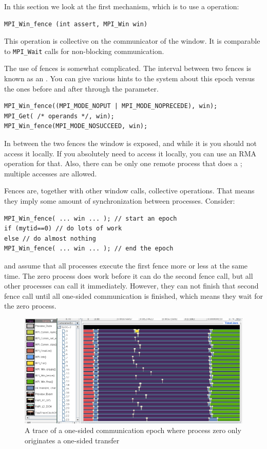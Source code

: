 In this section we look at the first mechanism,
which is to use a  operation:
\begin{lstlisting}
MPI_Win_fence (int assert, MPI_Win win)
\end{lstlisting}
This operation is collective on the communicator of the window.
It is comparable to \lstinline$MPI_Wait$ calls for non-blocking communication.

The use of fences is somewhat complicated. The interval between two fences
is known as an .
You can give various hints to the system about this epoch versus the ones
before and after through the  parameter.
\begin{lstlisting}
MPI_Win_fence((MPI_MODE_NOPUT | MPI_MODE_NOPRECEDE), win);
MPI_Get( /* operands */, win);
MPI_Win_fence(MPI_MODE_NOSUCCEED, win);
\end{lstlisting}
In between the two fences the window is exposed, and while it is you
should not access it locally. If you absolutely need to access it
locally, you can use an \ac{RMA} operation for that. Also, there can be only one
remote process that does a ; multiple  accesses are allowed.

Fences are, together with other window calls, collective operations. That means they 
imply some amount of synchronization between processes. Consider:
\begin{lstlisting}
MPI_Win_fence( ... win ... ); // start an epoch
if (mytid==0) // do lots of work
else // do almost nothing
MPI_Win_fence( ... win ... ); // end the epoch
\end{lstlisting}
and assume that all processes execute the first fence more or less at the same time.
The zero process does work before it can do the second fence call, but all other
processes can call it immediately. However, they can not finish that second fence call
until all one-sided communication is finished, which means they wait for the zero process.
\begin{figure}[ht]
  \includegraphics[scale=.4]{graphics/lonestar-twonode-put}%
  \caption{A trace of a one-sided communication epoch where process zero only originates
  a one-sided transfer}
  \label{fig:putblock}
\end{figure}

